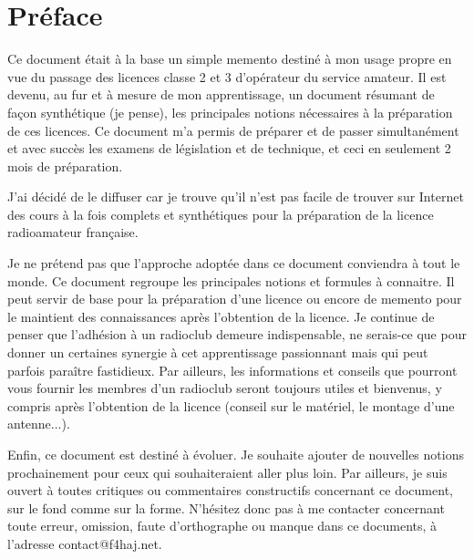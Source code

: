 \documentclass[a4paper,12pt,oneside]{report} %
\begin{document}
	\tableofcontents
	\newpage	
	
	\section{Préface}

	Ce document était à la base un simple memento destiné à mon usage propre en vue du passage des licences classe 2 et 3 d'opérateur du service amateur. Il est devenu, au fur et à mesure de mon apprentissage, un document résumant de façon synthétique (je pense), les principales notions nécessaires à la préparation de ces licences. Ce document m'a permis de préparer et de passer simultanément et avec succès les examens de législation et de technique, et ceci en seulement 2 mois de préparation.

	J'ai décidé de le diffuser car je trouve qu'il n'est pas facile de trouver sur Internet des cours à la fois complets et synthétiques pour la préparation de la licence radioamateur française.

	Je ne prétend pas que l'approche adoptée dans ce document conviendra à tout le monde. Ce document regroupe les principales notions et formules à connaitre. Il peut servir de base pour la préparation d'une licence ou encore de memento pour le maintient des connaissances après l'obtention de la licence. Je continue de penser que l'adhésion à un radioclub demeure indispensable, ne serais-ce que pour donner un certaines synergie à cet apprentissage passionnant mais qui peut parfois paraître fastidieux. Par ailleurs, les informations et conseils que pourront vous fournir les membres d'un radioclub seront toujours utiles et bienvenus, y compris après l'obtention de la licence (conseil sur le matériel, le montage d'une antenne...).

	Enfin, ce document est destiné à évoluer. Je souhaite ajouter de nouvelles notions prochainement pour ceux qui souhaiteraient aller plus loin. Par ailleurs, je suis ouvert à toutes critiques ou commentaires constructifs concernant ce document, sur le fond comme sur la forme. N'hésitez donc pas à me contacter concernant toute erreur, omission, faute d'orthographe ou manque dans ce documents, à l'adresse contact@f4haj.net.
\end{document}
